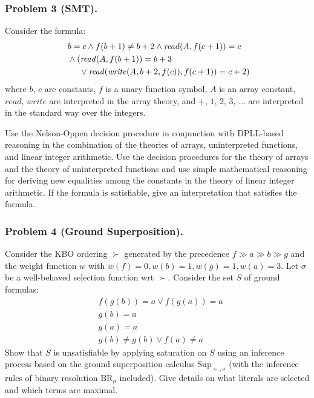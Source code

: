 \subsubsection*{Problem 3 (SMT).}
    Consider the formula:
\begin{align*}
%
& %
b = c
%
\land
%
f(b + 1)  \neq  b + 2
%
\land
%
\mathit{read}(A,f(c + 1)) = c
~\\~
& %
%
\land
%
(\mathit{read}(A,f(b + 1)) = b + 3
\\ & \hphantom{~\land (} \lor \mathit{read}(\mathit{write}(A,b + 2,f(c)),f(c + 1)) = c + 2)
%
\end{align*}
    where
    $b$, $c$ are constants,
    $f$ is a unary function symbol,
    $A$ is an array constant,
    $\mathit{read}$, $\mathit{write}$ are interpreted in the array theory,
    and
    $+$, $1$, $2$, $3$, $\ldots$ are interpreted in the standard way over the integers.
    \medskip

    \noindent
    Use the Nelson-Oppen decision procedure in conjunction with DPLL-based
    reasoning in the combination of the theories of arrays,
    uninterpreted functions, and linear integer arithmetic.
    Use the decision procedures for the theory of arrays and the theory of uninterpreted functions and use
    simple mathematical reasoning for deriving new equalities among the
    constants in the theory of linear integer arithmetic.
    If the formula is satisfiable, give an interpretation that satisfies the formula.\bigskip

\subsubsection*{Problem 4 (Ground Superposition).}
Consider the KBO ordering $\succ$ generated
by the precedence $f \gg a \gg b \gg g$
and the weight function $w$ with $w(f) = 0, w(b) = 1, w(g) = 1, w(a) = 3$.
Let $\sigma$ be a well-behaved selection function wrt $\succ$.
Consider the set $S$ of ground formulas:
\begin{align*}
%
& f(g(b)) = a \lor f(g(a)) = a
~\\~
& g(b) = a
~\\~
& g(a) = a
~\\~
& g(b)  \neq  g(b) \lor f(a)  \neq  a
%
\end{align*}
\noindent Show that $S$ is unsatisfiable by applying saturation on $S$ using an
inference process based on the ground superposition
calculus $\textrm{Sup}_{\succ,\sigma}$ (with the inference rules of
binary  resolution $\textrm{BR}_{\sigma}$ included).
 Give details on what literals
 are selected and which terms are maximal. \bigskip
